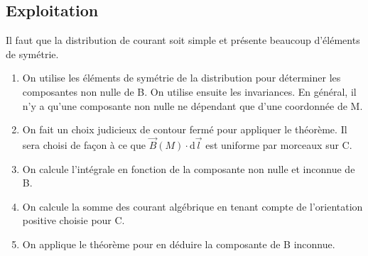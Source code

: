 \documentclass[french]{yLectureNote}
\renewcommand{\vec}{\overrightarrow}
\newcommand{\dd}{\mathrm{d}}
\newcommand{\B}{\vec{B}(M)}
\newcommand{\er}{\vec{e_{\rho}}}
\newcommand{\ep}{\vec{e_{\varphi}}}
\newcommand{\pip}{\pi^+}
\newcommand{\pim}{\pi^-}
\begin{document}
\subsection{Exploitation}
Il faut que la distribution de courant soit simple et présente beaucoup d'éléments de symétrie.
\begin{enumerate}
 \item On utilise les éléments de symétrie de la distribution pour déterminer les composantes non nulle de B. On utilise ensuite les invariances. En général, il n'y a qu'une composante non nulle ne dépendant que d'une coordonnée de M.
\item On fait un choix judicieux de contour fermé pour appliquer le théorème. Il sera choisi de façon à ce que \(\B\cdot \dd \vec{l}\) est uniforme par morceaux sur C.
\item On calcule l'intégrale en fonction de la composante non nulle et inconnue de B.
\item On calcule la somme des courant algébrique en tenant compte de l'orientation positive choisie pour C.
\item On applique le théorème pour en déduire la composante de B inconnue.
\end{enumerate}
%
\end{document}
